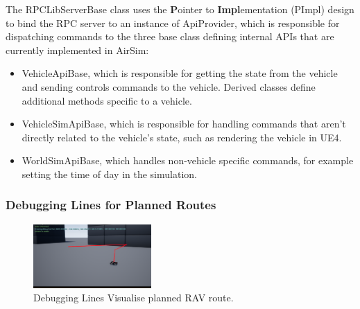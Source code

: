 The RPCLibServerBase class uses the \textbf{P}ointer to \textbf{Impl}ementation (PImpl) design to bind the RPC server to an instance of ApiProvider, which is responsible for dispatching commands to the three base class defining internal APIs that are currently implemented in AirSim: 
\begin{itemize}
    \item VehicleApiBase, which is responsible for getting the state from the vehicle and sending controls commands to the vehicle. Derived classes define additional methods specific to a vehicle.
    \item VehicleSimApiBase, which is responsible for handling commands that aren't directly related to the vehicle's state, such as rendering the vehicle in UE4.
    \item WorldSimApiBase, which handles non-vehicle specific commands, for example setting the time of day in the simulation.
\end{itemize}


\subsubsection{Debugging Lines for Planned Routes}

\begin{figure}
    \centering
    \includegraphics[width=0.4\textwidth]{Chapters/SimulationEnv/Figs/DebuggingLines/DebugLines.png}
    \caption{Debugging Lines Visualise planned RAV route.}
    \label{fig:DebuggingLines}
\end{figure}

